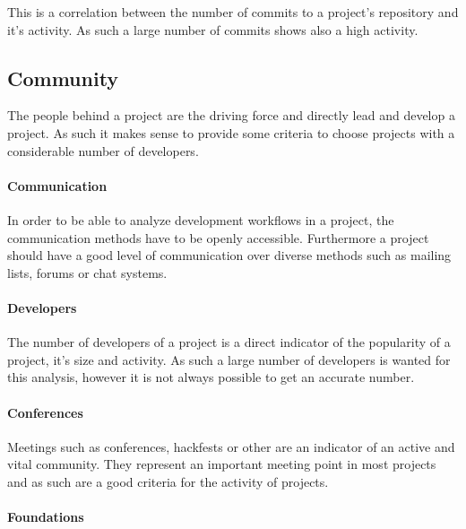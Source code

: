 This is a correlation between the number of commits to a project's repository
and it's activity. As such a large number of commits shows also a high
activity.



\subsection{Community} %

The people behind a project are the driving force and directly lead and develop
a project. As such it makes sense to provide some criteria to choose projects
with a considerable number of developers.

\paragraph{Communication} %

In order to be able to analyze development workflows in a project, the
communication methods have to be openly accessible. Furthermore a project
should have a good level of communication over diverse methods such as mailing
lists, forums or chat systems.


\paragraph{Developers} %

The number of developers of a project is a direct indicator of the popularity
of a project, it's size and activity. As such a large number of developers is
wanted for this analysis, however it is not always possible to get an accurate
number.


\paragraph{Conferences} %

Meetings such as conferences, hackfests or other are an indicator of an active
and vital community. They represent an important meeting point in most projects
and as such are a good criteria for the activity of projects.


\paragraph{Foundations} %

